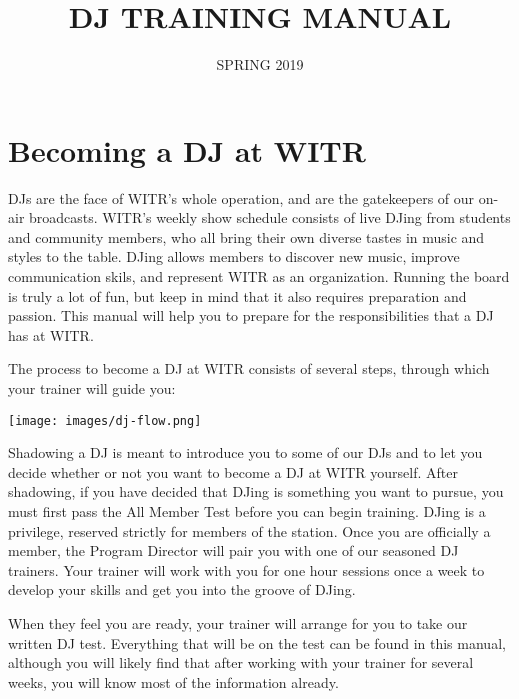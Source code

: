 \documentclass{witrman}
\title{DJ TRAINING MANUAL}
\date{SPRING 2019}
\begin{document}
\maketitle

\maketoc{}

\setpagebg{}


\chapter{Becoming a DJ at WITR}

DJs are the face of WITR's whole operation, and are the gatekeepers of our
on-air broadcasts.  WITR's weekly show schedule consists of live DJing from
students and community members, who all bring their own diverse tastes in music
and styles to the table.  DJing allows members to discover new music, improve
communication skils, and represent WITR as an organization.  Running the board
is truly a lot of fun, but keep in mind that it also requires preparation and
passion.  This manual will help you to prepare for the responsibilities that a
DJ has at WITR\@.

The process to become a DJ at WITR consists of several steps, through which your
trainer will guide you:

\texttt{[image: images/dj-flow.png]}

Shadowing a DJ is meant to introduce you to some of our DJs and to let you
decide whether or not you want to become a DJ at WITR yourself.  After
shadowing, if you have decided that DJing is something you want to pursue, you
must first pass the All Member Test before you can begin training.  DJing is a
privilege, reserved strictly for members of the station.  Once you are
officially a member, the Program Director will pair you with one of our seasoned
DJ trainers.  Your trainer will work with you for one hour sessions once a week
to develop your skills and get you into the groove of DJing.

When they feel you are ready, your trainer will arrange for you to take our
written DJ test.  Everything that will be on the test can be found in this
manual, although you will likely find that after working with your trainer for
several weeks, you will know most of the information already.
\end{document}
